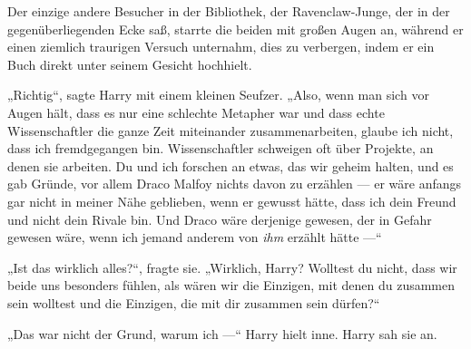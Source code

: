 Der einzige andere Besucher in der Bibliothek, der Ravenclaw-Junge, der in der gegenüberliegenden Ecke saß, starrte die beiden mit großen Augen an, während er einen ziemlich traurigen Versuch unternahm, dies zu verbergen, indem er ein Buch direkt unter seinem Gesicht hochhielt.

„Richtig“, sagte Harry mit einem kleinen Seufzer.
„Also, wenn man sich vor Augen hält, dass es nur eine schlechte Metapher war und dass echte Wissenschaftler die ganze Zeit miteinander zusammenarbeiten, glaube ich nicht, dass ich fremdgegangen bin. Wissenschaftler schweigen oft über Projekte, an denen sie arbeiten. Du und ich forschen an etwas, das wir geheim halten, und es gab Gründe, vor allem Draco Malfoy nichts davon zu erzählen — er wäre anfangs gar nicht in meiner Nähe geblieben, wenn er gewusst hätte, dass ich dein Freund und nicht dein Rivale bin. Und Draco wäre derjenige gewesen, der in Gefahr gewesen wäre, wenn ich jemand anderem von \emph{ihm} erzählt hätte —“

„Ist das wirklich alles?“, fragte sie.
„Wirklich, Harry? Wolltest du nicht, dass wir beide uns besonders fühlen, als wären wir die Einzigen, mit denen du zusammen sein wolltest und die Einzigen, die mit dir zusammen sein dürfen?“



„Das war nicht der Grund, warum ich —“ Harry hielt inne. Harry sah sie an.

